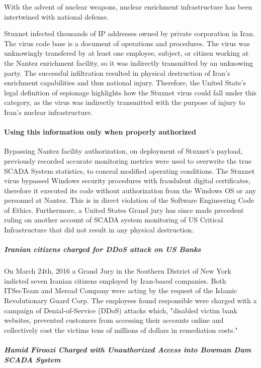 \documentclass[12pt]{article}
\begin{document}
\begin{multicols}{2}
With the advent of nuclear weapons, nuclear enrichment infrastructure has been intertwined with national defense.

Stuxnet infected thousands of IP addresses owned by private corporation in Iran. The virus code base is a document of operations and procedures. The virus was unknowingly transfered by at least one employee, subject, or citizen working at the Nantez enrichment facility, so it was indirectly transmitted by an unknowing party. The successful infiltration resulted in physical destruction of Iran's enrichment capabilities and thus national injury. Therefore, the United State's legal definition of espionage highlights how the Stuxnet virus could fall under this category, as the virus was indirectly transmitted with the purpose of injury to Iran's nuclear infrastructure.

\paragraph{Using this information only when properly authorized}

Bypassing Nantez facility authorization, on deployment of Stuxnet's payload, previously recorded accurate monitoring metrics were used to overwrite the true SCADA System statistics, to conceal modified operating conditions. The Stuxnet virus bypassed Windows security procedures with fraudulent digital certificates, therefore it executed its code without authorization from the Windows OS or any personnel at Nantez. This is in direct violation of the Software Engineering Code of Ethics. Furthermore, a United States Grand jury has since made precedent ruling on another account of SCADA system monitoring of US Critical Infrastructure that did not result in any physical destruction.

\subparagraph{Iranian citizens charged for DDoS attack on US Banks}

On March 24th, 2016 a Grand Jury in the Southern District of New York indicted seven Iranian citizens employed by Iran-based companies. Both ITSecTeam and Mersad Company were acting by the request of the Islamic Revolutionary Guard Corp. The employees found responsible were charged with a campaign of Denial-of-Service (DDoS) attacks which, "disabled victim bank websites, prevented customers from accessing their accounts online and collectively cost the victims tens of millions of dollars in remediation costs."\cite{sevenIraniansIndicted}

\subparagraph{Hamid Firoozi Charged with Unauthorized Access into Bowman Dam SCADA System}


\end{multicols}
\end{document}
